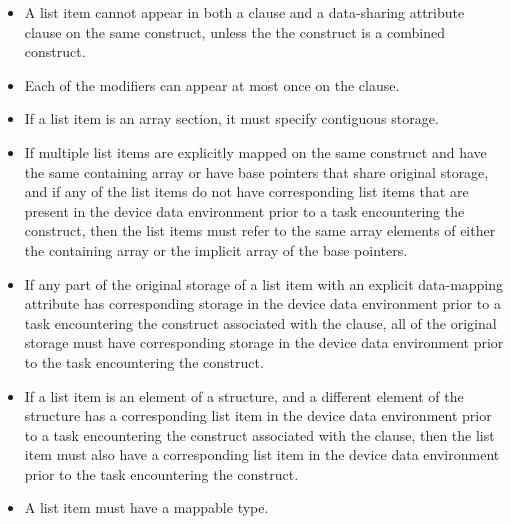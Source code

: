 \restrictions
\begin{itemize}

\item A list item cannot appear in both a  clause and a data-sharing
    attribute clause on the same construct, unless the the construct is a
    combined construct.

\item Each of the  modifiers can appear at most once on the
    clause.


\item If a list item is an array section, it must specify contiguous storage.

\item If multiple list items are explicitly mapped on the same
construct and have the same containing array or have base pointers that share
original storage, and if any of the list items do not have corresponding list
items that are present in the device data environment prior to a task
encountering the construct, then the list items must refer to the same array
elements of either the containing array or the implicit array of the base
pointers.

\item If any part of the original storage of a list item with an
explicit data-mapping attribute has corresponding storage in the device data
environment prior to a task encountering the construct associated with the
 clause, all of the original storage must have corresponding storage
in the device data environment prior to the task encountering the construct.

\item If a list item is an element of a structure, and a different element
of the structure has a corresponding list item in the device data environment
prior to a task encountering the construct associated with the 
clause, then the list item must also have a corresponding list item in the
device data environment prior to the task encountering the construct.

\item A list item must have a mappable type.


\end{itemize}
